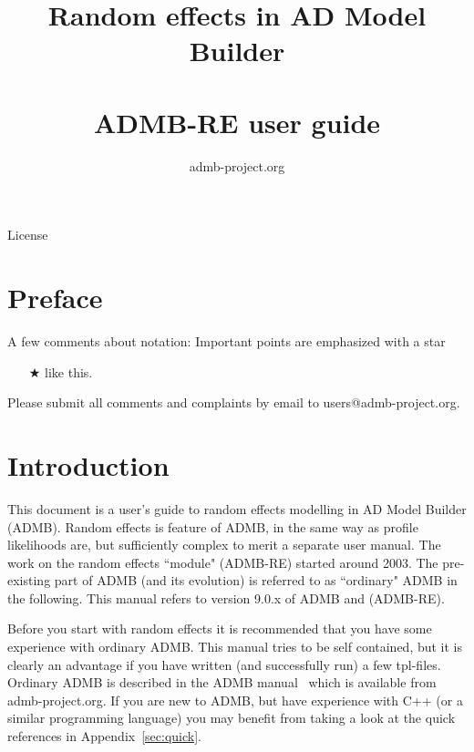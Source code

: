 \documentclass[12pt,letter,reqno]{book}
\begin{document}
\title{ Random effects in AD Model Builder\\~ \\
	ADMB-RE user guide}
\author{admb-project.org}

\maketitle

\centerline{\LARGE License}



\newpage

\tableofcontents

\chapter*{Preface}

A few comments about notation: Important points are emphasized with a star
\begin{itemize}
\item[$\bigstar$] like this.
\end{itemize}

Please submit all comments and complaints by email to users@admb-project.org.

\chapter{Introduction}

This document is a user's guide to random effects modelling in AD Model Builder (ADMB).
Random effects is feature of ADMB, in the same way as profile likelihoods are, 
but sufficiently complex to merit a separate user manual. The work on the random effects ``module" (ADMB-RE) 
started around 2003. The pre-existing part of ADMB (and its evolution) is referred to as ``ordinary" ADMB
in the following. This manual refers to version 9.0.x of ADMB and (ADMB-RE).

Before you start with random effects it is recommended that you have some experience
with ordinary ADMB. This manual tries to be self contained, but it is clearly an advantage if
you have written (and successfully run) a few tpl-files. Ordinary ADMB is described in 
the ADMB manual~\cite{admb_manual} which is available from admb-project.org.
If you are new to ADMB, but have experience with C++ (or a similar programming language)
you may benefit from taking a look at the quick references in Appendix~\ref{sec:quick}.
\end{document}

